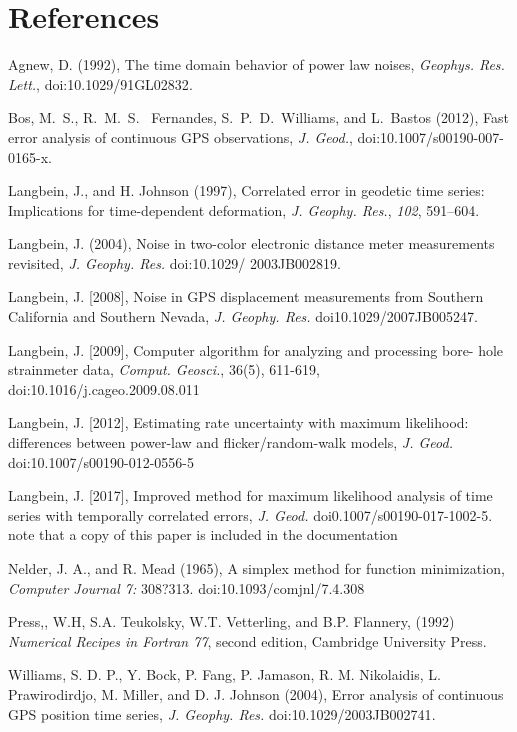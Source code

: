 \documentclass[12pt]{amsart}
\begin{document}
\section{References}

Agnew, D. (1992), The time domain behavior of power law noises, \textit{Geophys. Res. Lett.},  doi:{10.1029/91GL02832}.

Bos, M.~S., R.~M.~S.~ Fernandes, S.~P.~D.~Williams, and L.~Bastos (2012), Fast error analysis of
continuous GPS observations,
\textit{J. Geod.},  doi:{10.1007/s00190-007-0165-x}.

 
Langbein, J., and H. Johnson (1997), Correlated error in geodetic time series: Implications for
time-dependent deformation, \textit{J.  Geophy. Res.},  \textit{102}, 591--604.

Langbein, J. (2004), Noise in two-color electronic distance meter measurements revisited, 
 \textit{J.  Geophy. Res.}  doi:{10.1029/ 2003JB002819}.
 
Langbein, J. [2008], Noise in GPS displacement measurements from Southern California and Southern Nevada, 
 \textit{J.  Geophy. Res.}  doi{10.1029/2007JB005247}.

Langbein, J. [2009], Computer algorithm for analyzing and processing bore- hole strainmeter data, \textit{Comput. Geosci.}, 36(5), 611-619, doi:{10.1016/j.cageo.2009.08.011}

Langbein, J. [2012], Estimating rate uncertainty with maximum likelihood: differences between power-law and flicker/random-walk 
models, \textit{J. Geod.} doi:{10.1007/s00190-012-0556-5}

Langbein, J. [2017], Improved method for maximum likelihood analysis of time series with temporally correlated errors,
\textit{J. Geod.} doi{0.1007/s00190-017-1002-5}.  note that a copy of this paper is included in the documentation

Nelder, J. A., and R. Mead (1965), A simplex method for function minimization, \textit{Computer Journal 7:} 308?313. doi:10.1093/comjnl/7.4.308

Press,, W.H, S.A. Teukolsky, W.T. Vetterling, and B.P. Flannery, (1992) \textit{Numerical Recipes in Fortran 77}, second edition,
Cambridge University Press.

Williams, S. D. P., Y. Bock, P. Fang, P. Jamason, R. M. Nikolaidis,
L. Prawirodirdjo, M. Miller, and D. J. Johnson (2004), Error analysis of continuous GPS position time series, 
 \textit{J.  Geophy. Res.}  doi:{10.1029/2003JB002741}.
\end{document}
